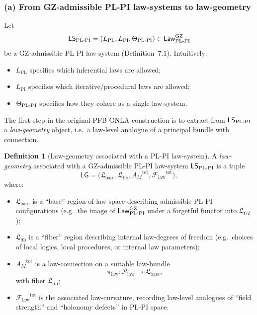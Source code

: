 \documentclass[11pt]{book}
\theoremstyle{plain}
\theoremstyle{definition}
\newtheorem{definition}[theorem]{Definition} \theoremstyle{remark}
\newcommand{\GZLS}{\ensuremath{\mathfrak{L}_{\mathrm{GZ}}}}       \newcommand{\GZLT}{\ensuremath{M_{!w}}}                           \newcommand{\GZLOC}{\ensuremath{A_M}}                             \newcommand{\GZLCurv}{\ensuremath{\mathcal{F}_{\mathrm{law}}}}
\begin{document}
\subsubsection*{(a) From GZ-admissible PL-PI law-systems to law-geometry}

Let
\[
   \mathsf{LS}_{\mathrm{PL\text- PI}}
   =
   (L_{\mathrm{PL}},L_{\mathrm{PI}};\Theta_{\mathrm{PL\text- PI}})
   \in
   \mathsf{Law}_{\mathrm{PL\text- PI}}^{\mathrm{GZ}}
\]
be a GZ-admissible PL-PI law-system (Definition~7.1). Intuitively:

\begin{itemize}
  \item $L_{\mathrm{PL}}$ specifies which inferential laws are allowed;
  \item $L_{\mathrm{PI}}$ specifies which iterative/procedural laws are
        allowed;
  \item $\Theta_{\mathrm{PL\text- PI}}$ specifies how they cohere as a
        single law-system.
\end{itemize}

The first step in the original PFB-GNLA construction is to extract from
$\mathsf{LS}_{\mathrm{PL\text- PI}}$ a \emph{law-geometry} object, i.e.\
a law-level analogue of a principal bundle with connection.

\begin{definition}[Law-geometry associated with a PL-PI law-system]
A \emph{law-geometry} associated with a GZ-admissible PL-PI
  law-system $\mathsf{LS}_{\mathrm{PL\text- PI}}$ is a tuple
  \[
    \mathsf{LG}
    =
    \bigl(
      \mathfrak{L}_{\mathrm{base}},
      \mathfrak{L}_{\mathrm{fib}},
      \GZLOC^{\mathrm{tot}},
      \GZLCurv^{\mathrm{tot}}
    \bigr),
  \]
  where:
  \begin{itemize}
    \item $\mathfrak{L}_{\mathrm{base}}$ is a “base” region of law-space
          describing admissible PL-PI configurations (e.g.\ the image
          of $\mathsf{Law}_{\mathrm{PL\text- PI}}^{\mathrm{GZ}}$ under
          a forgetful functor into \GZLS);
    \item $\mathfrak{L}_{\mathrm{fib}}$ is a “fiber” region describing
          internal law-degrees of freedom (e.g.\ choices of local
          logics, local procedures, or internal law parameters);
    \item $\GZLOC^{\mathrm{tot}}$ is a law-connection on a suitable
          law-bundle
          \[
            \pi_{\mathrm{law}}:
              \mathcal{P}_{\mathrm{law}}
              \longrightarrow
              \mathfrak{L}_{\mathrm{base}},
          \]
          with fiber $\mathfrak{L}_{\mathrm{fib}}$;
    \item $\GZLCurv^{\mathrm{tot}}$ is the associated law-curvature,
          recording law-level analogues of “field strength” and
          “holonomy defects” in PL-PI space.
  \end{itemize}
\end{definition}
\end{document}

